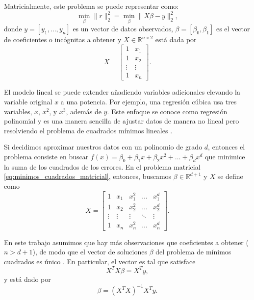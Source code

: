 \documentclass{article}
\begin{document}
Matricialmente, este problema se puede representar como:
%
\begin{equation} \label{eq:minimos_cuadrados_matricial}
    \min_{\beta} \lVert r \rVert_2^2 = \min_{\beta} \lVert X \beta - y \rVert_2^2,
\end{equation}
%
donde $y = [y_1, \ldots, y_n]$ es un vector de datos observados, $\beta = [\beta_0, \beta_1]$ es el vector de coeficientes o incógnitas a obtener y $X \in \mathbb{R}^{n \times 2}$ está dada por
%
\begin{equation} \nonumber
    X = \begin{bmatrix}
        1 & x_1 \\
        1 & x_2 \\
        \vdots & \vdots \\
        1 & x_n
    \end{bmatrix}.
\end{equation}


El modelo lineal se puede extender añadiendo variables adicionales elevando la variable original $x$ a una potencia. Por ejemplo, una regresión cúbica usa tres variables, $x$, $x^2$, y $x^3$, además de $y$. Este enfoque se conoce como regresión polinomial y es una manera sencilla de ajustar datos de manera no lineal pero resolviendo el problema de cuadrados mínimos lineales \citep{james2013introduction}.

Si decidimos aproximar nuestros datos con un polinomio de grado $d$, entonces el problema consiste en buscar $f(x) = \beta_0 + \beta_1 x + \beta_2 x^2 + \ldots + \beta_{d} x^{d}$ que minimice la suma de los cuadrados de los errores. En el problema matricial \ref{eq:minimos_cuadrados_matricial}, entonces, buscamos $\beta \in \mathbb{R}^{d+1}$ y $X$ se define como
%
\begin{equation} \label{eq:matriz_x}
    X = \begin{bmatrix}
        1 & x_1 & x_1^2 & \ldots & x_1^d \\
        1 & x_2 & x_2^2 & \ldots & x_2^d \\
        \vdots & \vdots & \vdots & \ddots & \vdots \\
        1 & x_n & x_n^2 & \ldots & x_n^d
    \end{bmatrix}.
\end{equation}


En este trabajo asumimos que hay más observaciones que coeficientes a obtener ($n > d+1$), de modo que el vector de soluciones $\beta$ del problema de mínimos cuadrados es único \citep{watkins2004fundamentals}. En particular, el vector es tal que satisface 
%
\begin{equation} \label{eq:ecuaciones_normales}
    X^T X \beta = X^T y,
\end{equation}
%
y está dado por
%
\begin{equation} \label{eq:minimos_cuadrados_solucion}
    \beta = (X^T X)^{-1} X^T y.
\end{equation}
\end{document}
